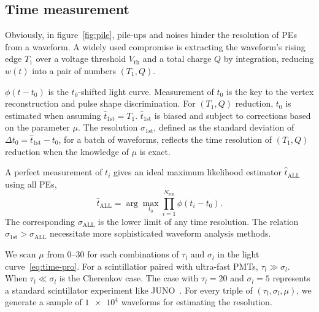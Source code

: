 \subsection{Time measurement}
Obviously, in figure~\ref{fig:pile}, pile-ups and noises hinder the resolution of PEs from a waveform. A widely used compromise is extracting the waveform's rising edge $T_1$ over a voltage threshold $V_\mathrm{th}$ and a total charge $Q$ by integration, reducing $w(t)$ into a pair of numbers $(T_1, Q)$.

$\phi(t-t_0)$ is the $t_0$-shifted light curve. Measurement of $t_0$ is the key to the vertex reconstruction and pulse shape discrimination. For $(T_1, Q)$ reduction, $t_0$ is estimated when assuming $\hat{t}_\mathrm{1st} = T_1$. $\hat{t}_\mathrm{1st}$ is biased and subject to corrections based on the parameter $\mu$. The resolution $\sigma_\mathrm{1st}$, defined as the standard deviation of $\Delta t_0 = \hat{t}_\mathrm{1st} - t_0$, for a batch of waveforms, reflects the time resolution of $(T_1, Q)$ reduction when the knowledge of $\mu$ is exact. 

A perfect measurement of $t_i$ gives an ideal maximum likelihood estimator $\hat{t}_\mathrm{ALL}$ using all PEs,
\begin{equation}
  \label{eq:2}
  \hat{t}_\mathrm{ALL} = \arg\underset{t_0}{\max} \prod_{i=1}^{N_\mathrm{PE}} \phi(t_i-t_0).
\end{equation}
The corresponding $\sigma_\mathrm{ALL}$ is the lower limit of any time resolution. The relation $\sigma_\mathrm{1st} > \sigma_\mathrm{ALL}$ necessitate more sophisticated waveform analysis methods.

We scan $\mu$ from \numrange{0}{30} for each combinations of $\tau_l$ and $\sigma_l$ in the light curve~\eqref{eq:time-pro}. For a scintillatior paired with ultra-fast PMTs, $\tau_l \gg \sigma_l$. When $\tau_l \ll \sigma_l$ is the Cherenkov case. The case with $\tau_l=20$ and $\sigma_l=5$ represents a standard scintillator experiment like JUNO~\cite{rebber_particle_2021}. For every triple of $(\tau_l, \sigma_l, \mu)$, we generate a sample of $\num[retain-unity-mantissa=false]{1e4}$ waveforms for estimating the resolution. 

